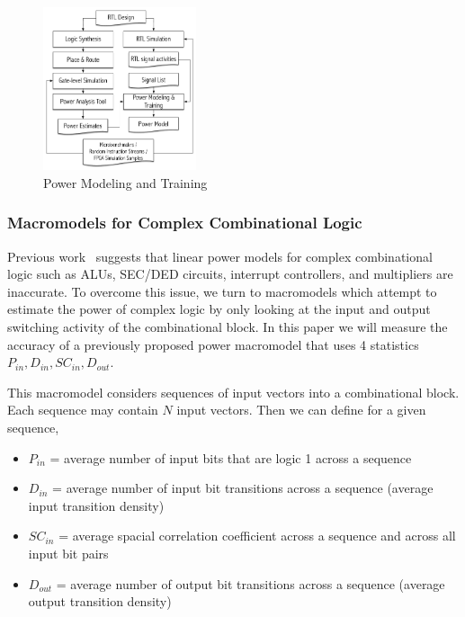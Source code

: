 \begin{figure}[!ht]
	\centering
	\includegraphics[width=0.4\textwidth,height=\textheight,keepaspectratio]{images/power_modeling.pdf}
	\caption{Power Modeling and Training}
	\label{fig:power_modeling}
\end{figure}

\subsubsection{Macromodels for Complex Combinational Logic}
Previous work~\cite{Sunwoo2010} suggests that linear power models for complex combinational logic such as ALUs, SEC/DED circuits, interrupt controllers, and multipliers are inaccurate. To overcome this issue, we turn to macromodels which attempt to estimate the power of complex logic by only looking at the input and output switching activity of the combinational block. In this paper we will measure the accuracy of a previously proposed power macromodel that uses 4 statistics $P_{in}, D_{in}, SC_{in}, D_{out}$.~\cite{Najm2000}\cite{Najm2000_2}

This macromodel considers sequences of input vectors into a combinational block. Each sequence may contain $N$ input vectors. Then we can define for a given sequence,
\begin{itemize}
	\item $P_{in}$ = average number of input bits that are logic 1 across a sequence
	\item $D_{in}$ = average number of input bit transitions across a sequence (average input transition density)
	\item $SC_{in}$ = average spacial correlation coefficient across a sequence and across all input bit pairs
	\item $D_{out}$ = average number of output bit transitions across a sequence (average output transition density)
\end{itemize}


